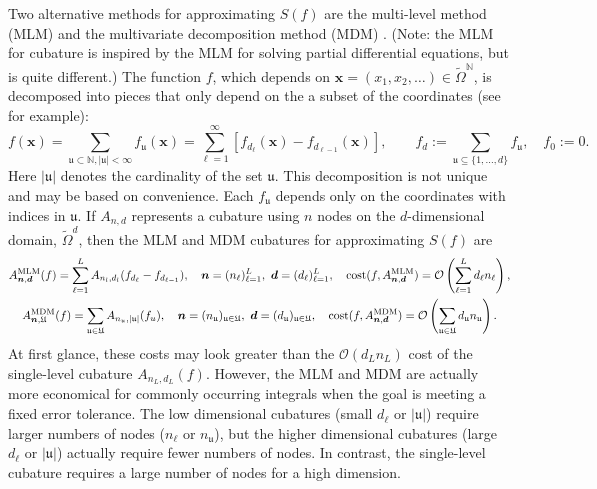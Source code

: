 \documentclass[11pt]{NSFamsart}
\DeclareMathOperator{\cost}{cost}
\newcommand{\naturals}{{\mathbb{N}}}
\newcommand{\fu}{\mathfrak{u}}
\newcommand{\tOmega}{\widetilde{\Omega}}
\newcommand{\bd}{{\boldsymbol{d}}}
\newcommand{\bx}{{\boldsymbol{x}}}
\newcommand{\bn}{{\boldsymbol{n}}}
\newcommand{\fU}{\mathfrak{U}}
\def\abs#1{\ensuremath{\left \lvert #1 \right \rvert}}
\newcommand{\Order}{\mathcal{O}}
\begin{document}
Two alternative methods for approximating $S(f)$ are the multi-level method (MLM) \cite{Gil15a} 
and the 
multivariate 
decomposition method (MDM) \cite{Was13b}.  (Note: the MLM for cubature is inspired by the MLM 
for solving partial differential equations, but is quite different.) The function $f$, which depends on 
$\bx=(x_1, x_2, 
\ldots) \in 
\tOmega^\naturals$, 
is decomposed into pieces that only depend on the a subset of the coordinates (see 
\cite{WanHic00b} for example):  
\begin{equation*}
f(\bx) = \sum_{\fu \subset \naturals, \abs{\fu} < \infty} f_{\fu}(\bx) = \sum_{\ell 
=1}^\infty [f_{d_\ell}(\bx) - f_{d_{\ell-1}}(\bx)], \qquad  f_d:= \sum_{\fu \subseteq \{1, 
\ldots, d\}} f_\fu, \quad f_0:= 0.
\end{equation*}
Here $\abs{\fu}$ denotes the cardinality of the set $\fu$.  This decomposition is not unique and may 
be based on convenience.  Each $f_{\fu}$ depends 
only 
on the coordinates with indices in $\fu$.  If $A_{n,d}$ represents a cubature 
using $n$ nodes on the $d$-dimensional domain, $\tOmega^d$, then the MLM and MDM cubatures 
for 
approximating $S(f)$ are \cite{Gil15a, Was13b}
\begin{gather*}
A^{\textup{MLM}}_{\bn,\bd}(f) = \sum_{\ell=1}^L A_{n_l,d_l}(f_{d_\ell} - f_{d_{\ell-1}}), \quad \bn = 
(n_\ell)_{\ell = 1}^L, \ \bd = 
(d_\ell)_{\ell = 1}^L, \quad \cost(f,A^{\textup{MLM}}_{\bn,\bd}) = \Order\left (\sum_{\ell=1}^L d_\ell 
n_\ell \right), \\
A^{\textup{MDM}}_{\bn,\fU}(f) = \sum_{\fu \in \fU} A_{n_{\fu},\abs{\fu}}(f_{u}), \quad \bn = 
(n_\fu)_{\fu \in \fU}, \ \bd = 
(d_\fu)_{\fu \in \fU}, \quad \cost(f,A^{\textup{MDM}}_{\bn,\bd}) = \Order\left (\sum_{\fu \in \fU} d_\fu 
n_\fu\right).
\end{gather*}
At first glance, these costs may look greater than the $\Order(d_L n_L)$ cost of the single-level 
cubature 
$A_{n_L,d_L}(f)$.  However, the MLM and MDM are actually more 
economical for commonly occurring integrals when the goal is meeting a fixed error tolerance.   The 
low dimensional cubatures (small $d_\ell$ or $\abs{\fu}$) require 
larger numbers of nodes ($n_\ell$ or $n_{\fu}$),  
but the higher dimensional cubatures (large $d_\ell$ or $\abs{\fu}$) actually require fewer numbers 
of nodes.  In contrast, the single-level cubature requires a large number of nodes for a high 
dimension.
\end{document}
